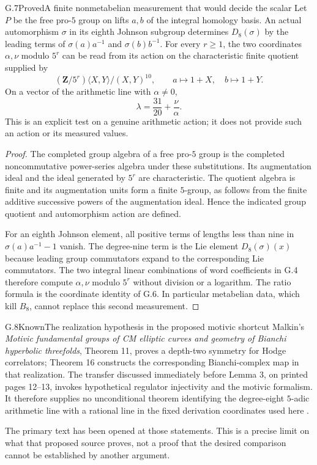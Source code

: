 \begin{statement}{G.7}{Proved}{A finite nonmetabelian measurement that would decide the scalar}
Let $P$ be the free pro-$5$ group on lifts $a,b$ of the integral
homology basis. An actual automorphism $\sigma$ in its eighth
Johnson subgroup determines $D_8(\sigma)$ by the leading terms of
$\sigma(a)a^{-1}$ and $\sigma(b)b^{-1}$. For every $r\geq1$,
the two coordinates $\alpha,\nu$ modulo $5^r$ can be read from its
action on the characteristic finite quotient supplied by
\[
 (\mathbf Z/5^r)\langle X,Y\rangle/(X,Y)^{10},
 \qquad a\mapsto1+X,\quad b\mapsto1+Y.
\]
On a vector of the arithmetic line with $\alpha\ne0$,
\[
       \lambda=\frac{31}{20}+\frac{\nu}{\alpha}.
\]
This is an explicit test on a genuine arithmetic action; it does
not provide such an action or its measured values.
\end{statement}
\begin{proof}
The completed group algebra of a free pro-$5$ group is the completed
noncommutative power-series algebra under these substitutions.
Its augmentation ideal and the ideal generated by $5^r$ are
characteristic. The quotient algebra is finite and its augmentation
units form a finite $5$-group, as follows from the finite additive
successive powers of the augmentation ideal. Hence the indicated
group quotient and automorphism action are defined.

For an eighth Johnson element, all positive terms of lengths less
than nine in $\sigma(a)a^{-1}-1$ vanish. The degree-nine term is
the Lie element $D_8(\sigma)(x)$ because leading group commutators
expand to the corresponding Lie commutators. The two integral
linear combinations of word coefficients in G.4 therefore compute
$\alpha,\nu$ modulo $5^r$ without division or a logarithm.
The ratio formula is the coordinate identity of G.6. In particular
metabelian data, which kill $B_8$, cannot replace this second
measurement.
\end{proof}

\begin{statement}{G.8}{Known}{The realization hypothesis in the proposed motivic shortcut}
Malkin's \emph{Motivic fundamental groups of CM elliptic curves
and geometry of Bianchi hyperbolic threefolds}, Theorem 11,
proves a depth-two symmetry for Hodge correlators; Theorem 16
constructs the corresponding Bianchi-complex map in that realization.
The transfer discussed immediately before Lemma 3, on printed
pages 12--13, invokes hypothetical regulator injectivity and the
motivic formalism. It therefore supplies no unconditional theorem
identifying the degree-eight $5$-adic arithmetic line with a rational
line in the fixed derivation coordinates used here
\cite{fghMalkin}.
\end{statement}
The primary text has been opened at those statements. This is a
precise limit on what that proposed source proves, not a proof that
the desired comparison cannot be established by another argument.

